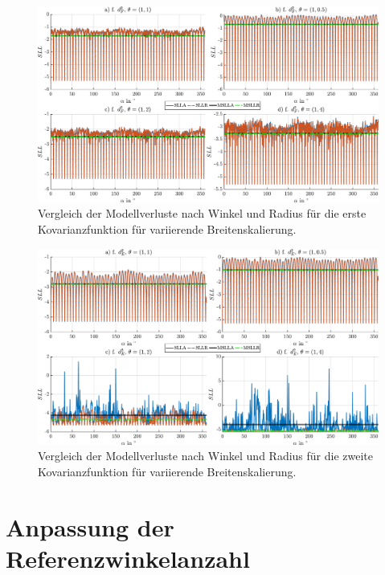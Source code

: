 \begin{figure}[tbph]
	\centering
	\includegraphics[width=\linewidth]{appendix/images/8-Ergebnisse-Experimente/Vergleich-QFC-SLL}
	\caption[Vergleich der Modellverluste nach Winkel und Radius für die erste Kovarianzfunktion]{Vergleich der Modellverluste nach Winkel und Radius für die erste Kovarianzfunktion für variierende Breitenskalierung.}
	\label{fig:vergleich-qfc-sll}
\end{figure}


\begin{figure}[tbph]
	\centering
	\includegraphics[width=\linewidth]{appendix/images/8-Ergebnisse-Experimente/Vergleich-QFCAPX-SLL}
	\caption[Vergleich der Modellverluste nach Winkel und Radius für die zweite Kovarianzfunktion]{Vergleich der Modellverluste nach Winkel und Radius für die zweite Kovarianzfunktion für variierende Breitenskalierung.}
	\label{fig:vergleich-qfcapx-sll}
\end{figure}


\clearpage


\section{Anpassung der Referenzwinkelanzahl}\label{sec:ergexp2}


